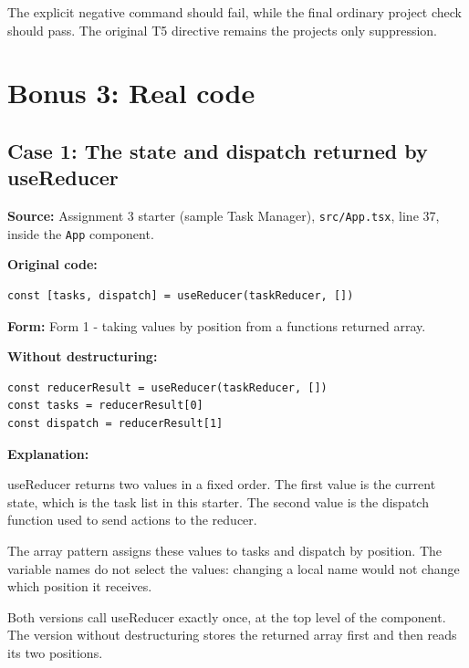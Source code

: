 \documentclass[
  10pt,
  a4paper,
  titlepage]{article}
\newcommand{\passthrough}[1]{#1}
\begin{document}
The explicit negative command should fail, while the final ordinary
project check should pass. The original T5 directive remains the
project\textquotesingle s only suppression.

\section{Bonus 3: Real code}\label{bonus-3-real-code}

\subsection{Case 1: The state and dispatch returned by
useReducer}\label{case-1-the-state-and-dispatch-returned-by-usereducer}

\textbf{Source:} Assignment 3 starter (sample Task Manager),
\passthrough{\lstinline!src/App.tsx!}, line 37, inside the
\passthrough{\lstinline!App!} component.

\textbf{Original code:}

\Needspace{30.9pt}
\begin{lstlisting}[language=TSX]
const [tasks, dispatch] = useReducer(taskReducer, [])
\end{lstlisting}

\textbf{Form:} Form 1 - taking values by position from a
function\textquotesingle s returned array.


\textbf{Without destructuring:}

\Needspace{51.5pt}
\begin{lstlisting}[language=TSX]
const reducerResult = useReducer(taskReducer, [])
const tasks = reducerResult[0]
const dispatch = reducerResult[1]
\end{lstlisting}


\textbf{Explanation:}

useReducer returns two values in a fixed order. The first value is the
current state, which is the task list in this starter. The second value
is the dispatch function used to send actions to the reducer.

The array pattern assigns these values to tasks and dispatch by
position. The variable names do not select the values: changing a local
name would not change which position it receives.

Both versions call useReducer exactly once, at the top level of the
component. The version without destructuring stores the returned array
first and then reads its two positions.
\end{document}

